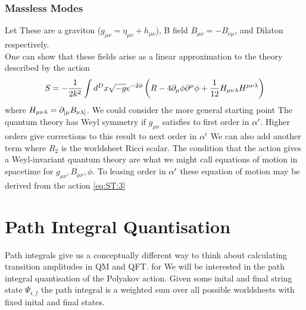 \documentclass{article}
\begin{document}
\subsubsection*{Massless Modes}
Let 
These are a graviton ($g_{\mu\nu} = \eta_{\mu\nu} + h_{\mu\nu}$), B field $B_{\mu\nu} = -B_{\nu\mu}$, and Dilaton respectively. \\
One can show that these fields arise as a linear approximation to the theory described by the action
\begin{align} \label{eq:ST:3}
S = -\frac{1}{2k^2} \int d^D x \sqrt{-g} e^{-2\phi} \left( R - 4\partial_\mu \phi \partial^\mu \phi + \frac{1}{12} H_{\mu\nu\lambda}H^{\mu\nu\lambda}\right)
\end{align}
where $H_{\mu\nu\lambda}=\partial_{[\mu}B_{\nu\lambda]}$.
We could consider the more general starting point 
The quantum theory has Weyl symmetry if $g_{\mu\nu}$ satisfies 
to first order in $\alpha^\prime$. Higher orders give corrections to this result to next order in $\alpha^\prime$
We can also add another term 
where $R_2$ is the worldsheet Ricci scalar. The condition that the action 
gives a Weyl-invariant quantum theory are what we might call equations of motion in spacetime for $g_{\mu\nu}, B_{\mu\nu}, \phi$. To leasing order in $\alpha^\prime$ these equation of motion may be derived from the action \ref{eq:ST:3}

\section{Path Integral Quantisation}
Path integrals give us a conceptually different way to think about calculating transition amplitudes in QM and QFT. 
for 
We will be interested in the path integral quantisation of the Polyakov action. 
Given some inital and final string state $\Psi_{i,f}$ the path integral is  
a weighted sum over all possible worldsheets with fixed inital and final states. 
\end{document}
